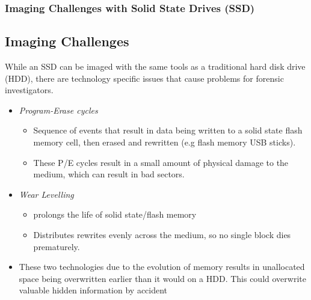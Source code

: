 \documentclass{beamer}
\begin{document}
\begin{frame}
	\frametitle{Imaging Challenges with Solid State Drives (SSD)}
	\subsection{Imaging Challenges}
	While an SSD can be imaged with the same tools as a traditional hard disk drive (HDD), there are technology specific issues that cause problems for forensic investigators.
	\begin{itemize}
		\item \emph{Program-Erase cycles}
			\begin{itemize}
				\item Sequence of events that result in data being written to a solid state flash memory cell, then erased and rewritten (e.g flash memory USB sticks). 
				\item These P/E cycles result in a small amount of physical damage to the medium, which can result in bad sectors.
			\end{itemize}
		\item \emph{Wear Levelling}
			\begin{itemize}
				\item prolongs the life of solid state/flash memory
				\item Distributes rewrites evenly across the medium, so no single block dies prematurely.
			\end{itemize}
		\item These two technologies due to the evolution of memory results in unallocated space being overwritten earlier than it would on a HDD. This could overwrite valuable hidden information by accident
	\end{itemize}
\end{frame}
\end{document}
